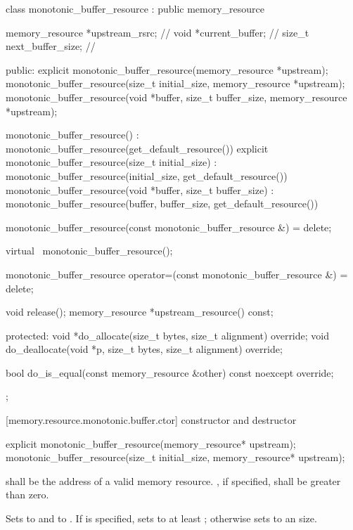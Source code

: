 %
\begin{codeblock}
class monotonic_buffer_resource : public memory_resource {
  memory_resource *upstream_rsrc; // \expos
  void *current_buffer;           // \expos
  size_t next_buffer_size;        // \expos

public:
  explicit monotonic_buffer_resource(memory_resource *upstream);
  monotonic_buffer_resource(size_t initial_size, memory_resource *upstream);
  monotonic_buffer_resource(void *buffer, size_t buffer_size,
                            memory_resource *upstream);

  monotonic_buffer_resource()
      : monotonic_buffer_resource(get_default_resource()) {}
  explicit monotonic_buffer_resource(size_t initial_size)
      : monotonic_buffer_resource(initial_size, get_default_resource()) {}
  monotonic_buffer_resource(void *buffer, size_t buffer_size)
      : monotonic_buffer_resource(buffer, buffer_size, get_default_resource()) {}

  monotonic_buffer_resource(const monotonic_buffer_resource &) = delete;

  virtual ~monotonic_buffer_resource();

  monotonic_buffer_resource
    operator=(const monotonic_buffer_resource &) = delete;

  void release();
  memory_resource *upstream_resource() const;

protected:
  void *do_allocate(size_t bytes, size_t alignment) override;
  void do_deallocate(void *p, size_t bytes, size_t alignment) override;

  bool do_is_equal(const memory_resource &other) const noexcept override;
};
\end{codeblock}

[memory.resource.monotonic.buffer.ctor]{ constructor and destructor}

%
\begin{itemdecl}
explicit monotonic_buffer_resource(memory_resource* upstream);
monotonic_buffer_resource(size_t initial_size, memory_resource* upstream);
\end{itemdecl}

\begin{itemdescr}
\pnum
\requires
{} shall be the address of a valid memory resource.
, if specified, shall be greater than zero.

\pnum
\effects
Sets  to  and
 to .
If  is specified,
sets  to at least ;
otherwise sets  to an
 size.
\end{itemdescr}

